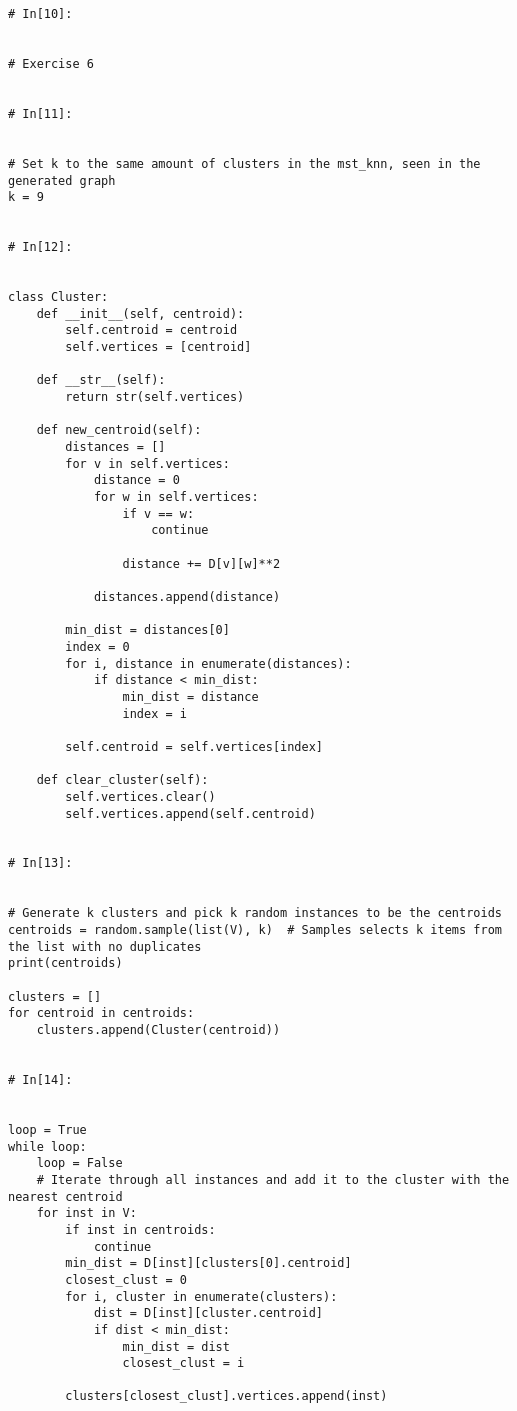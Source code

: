 \documentclass[11pt, a4paper]{article}
\begin{document}
\begin{verbatim}
# In[10]:


# Exercise 6


# In[11]:


# Set k to the same amount of clusters in the mst_knn, seen in the generated graph
k = 9


# In[12]:


class Cluster:
    def __init__(self, centroid):
        self.centroid = centroid
        self.vertices = [centroid]
        
    def __str__(self):
        return str(self.vertices)
        
    def new_centroid(self):
        distances = []
        for v in self.vertices:
            distance = 0
            for w in self.vertices:
                if v == w:
                    continue
                    
                distance += D[v][w]**2
                
            distances.append(distance)
            
        min_dist = distances[0]
        index = 0
        for i, distance in enumerate(distances):
            if distance < min_dist:
                min_dist = distance
                index = i
                
        self.centroid = self.vertices[index]
    
    def clear_cluster(self):
        self.vertices.clear()
        self.vertices.append(self.centroid)


# In[13]:


# Generate k clusters and pick k random instances to be the centroids
centroids = random.sample(list(V), k)  # Samples selects k items from the list with no duplicates
print(centroids)

clusters = []
for centroid in centroids:
    clusters.append(Cluster(centroid))


# In[14]:


loop = True
while loop:
    loop = False
    # Iterate through all instances and add it to the cluster with the nearest centroid
    for inst in V:
        if inst in centroids:
            continue
        min_dist = D[inst][clusters[0].centroid]
        closest_clust = 0
        for i, cluster in enumerate(clusters):    
            dist = D[inst][cluster.centroid]
            if dist < min_dist:
                min_dist = dist
                closest_clust = i

        clusters[closest_clust].vertices.append(inst)


\end{verbatim}
\end{document}
